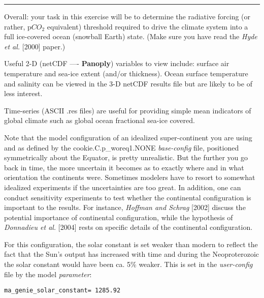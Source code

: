 \vspace{-1mm}
\noindent\rule{4cm}{0.5pt}
\vspace{2mm}

\noindent Overall: your task in this exercise will be to determine the radiative forcing (or rather, p\(CO_{2}\) equivalent) threshold required to drive the climate system into a full ice-covered ocean (snowball Earth) state. (Make sure you have read the \textit{Hyde et al.} [2000] paper.)

Useful 2-D (netCDF —- \textbf{Panoply}) variables to view include: surface air temperature and sea-ice extent (and/or thickness). Ocean surface temperature and salinity can be viewed in the 3-D netCDF results file but are likely to be of less interest.

Time-series (ASCII \textsf{\footnotesize .res} files) are useful for providing simple mean indicators of global climate such as global ocean fractional sea-ice covered.

Note that the model configuration of an idealized super-continent you are using and as defined by the \textsf{\footnotesize cookie.C.p\_woreq1.NONE} \textit{base-config} file, positioned symmetrically about the Equator, is pretty unrealistic. But the further you go back in time, the more uncertain it becomes as to exactly where and in what orientation the continents were. Sometimes modelers have to resort to somewhat idealized experiments if the uncertainties are too great. In addition, one can conduct sensitivity experiments to test whether the continental configuration is important to the results. For instance, \textit{Hoffman and Schrag} [2002] discuss the potential importance of continental configuration, while the hypothesis of \textit{Donnadieu et al.} [2004] rests on specific details of the continental configuration.

For this configuration, the solar constant is set weaker than modern to reflect the fact that the Sun’s output has increased with time and during the Neoproterozoic the solar constant would have been ca. 5\% weaker. This is set in the \textit{user-config} file by the model \textit{parameter}:

\vspace{-1mm}
\small\begin{verbatim}
ma_genie_solar_constant= 1285.92
\end{verbatim}\normalsize
\vspace{-1mm}

